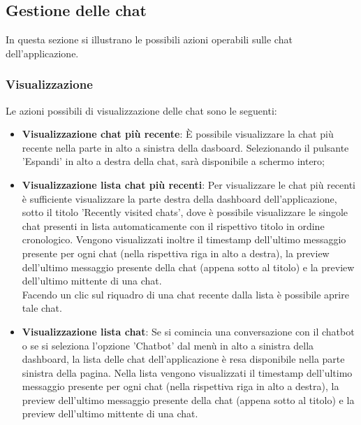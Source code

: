 \documentclass[10pt, a4paper]{article}
\begin{document}
\subsection{Gestione delle chat}
In questa sezione si illustrano le possibili azioni operabili sulle chat dell'applicazione. 
\subsubsection{Visualizzazione}
Le azioni possibili di visualizzazione delle chat sono le seguenti:
\begin{itemize}
    \item \textbf{Visualizzazione chat più recente}: È possibile visualizzare la chat più recente nella parte in alto a sinistra della dasboard. Selezionando il pulsante 'Espandi' in alto a destra della chat, sarà disponibile a schermo intero;
    \item \textbf{Visualizzazione lista chat più recenti}: Per visualizzare le chat più recenti è sufficiente visualizzare la parte destra della dashboard dell'applicazione, sotto il titolo 'Recently visited chats', dove è possibile visualizzare le singole chat presenti in lista automaticamente con il rispettivo titolo in ordine cronologico. Vengono visualizzati inoltre il timestamp dell'ultimo messaggio presente per ogni chat (nella rispettiva riga in alto a destra), la preview dell'ultimo messaggio presente della chat (appena sotto al titolo) e la preview dell'ultimo mittente di una chat.\\
    Facendo un clic sul riquadro di una chat recente dalla lista è possibile aprire tale chat.
    \item \textbf{Visualizzazione lista chat}: Se si comincia una conversazione con il chatbot o se si seleziona l'opzione 'Chatbot' dal menù in alto a sinistra della dashboard, la lista delle chat dell'applicazione è resa disponibile nella parte sinistra della pagina. Nella lista vengono visualizzati il timestamp dell'ultimo messaggio presente per ogni chat (nella rispettiva riga in alto a destra), la preview dell'ultimo messaggio presente della chat (appena sotto al titolo) e la preview dell'ultimo mittente di una chat.
\end{itemize}
\end{document}
